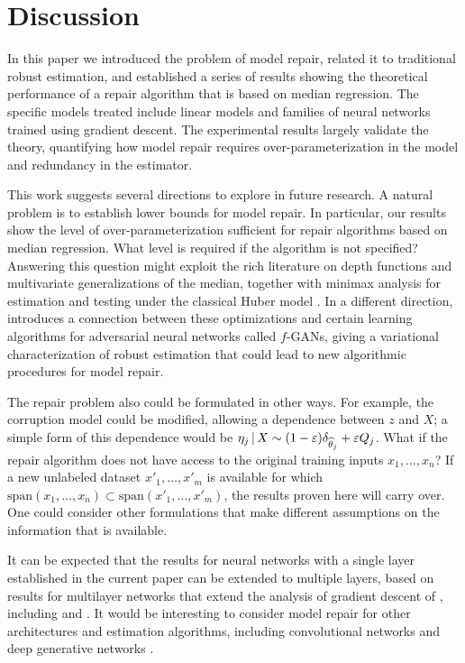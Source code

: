 
\def\ones{{\mathds{1}}}

\section{Discussion}
\label{sec:discuss}

In this paper we introduced the problem of model repair, related it to traditional robust estimation, and established a series of results showing the theoretical performance of a repair algorithm that is based on median regression. The specific models treated include linear models and families of neural networks trained using gradient descent. The experimental results largely validate the theory, quantifying how model repair requires over-parameterization in the model and redundancy in the estimator.

This work suggests several directions to explore in future research.  A natural problem is to establish lower bounds for  model repair. In particular, our results show the level of over-parameterization sufficient for repair algorithms based on median regression. What level is required if the algorithm is not specified? Answering this question might exploit the rich literature on depth functions and multivariate generalizations of the median, together with minimax analysis for estimation and testing under the classical Huber model \citep{chen2018robust,diakonikolas,diakonikolas:2017}. In a different direction, \cite{gao2018robust} introduces a connection between these optimizations and certain learning algorithms for adversarial neural networks called $f$-GANs, giving a variational characterization of robust estimation that could lead to new algorithmic procedures for model repair.


The repair problem also could be formulated in other ways.  For example,
the corruption model could be modified, allowing a dependence between $z$ and $X$;
a simple form of this dependence would be $\eta_j \,|\, X \sim (1-\varepsilon) \delta_{\widehat\theta_j} + \varepsilon Q_j$.
What if the repair algorithm does not have access to the original training inputs $x_1,\ldots, x_n$?
If a new unlabeled dataset $x'_1,\ldots, x'_{m}$ is available for which $\text{span}(x_1,\ldots,x_n) \subset \text{span}(x'_1,\ldots,x'_{m})$, the results proven here will carry over. One could consider other formulations that make different assumptions on the information that is available.

It can be expected that the results for neural networks with a single layer established in the current paper
can be extended to multiple layers, based on results for multilayer networks that extend the analysis of gradient descent
of \cite{du2018gradient}, including \cite{zhuli} and \cite{dulee}. It would be interesting to
consider model repair for other architectures and estimation algorithms, including convolutional networks
and deep generative networks \citep{goodfellow2014generative,nvp,glow}.

